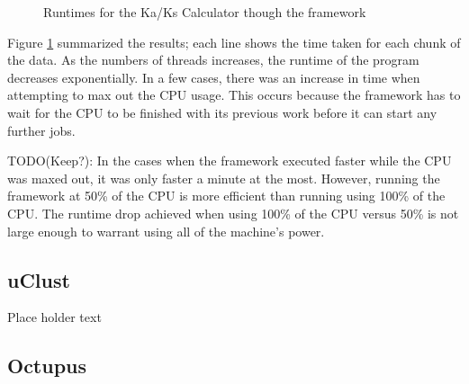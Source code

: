 \documentclass[12pt]{article}
\begin{document}
\begin{figure}
{}
\caption{Runtimes for the Ka/Ks Calculator though the framework}
\label{fig:kaksgraph}
\end{figure}

Figure \ref{fig:kaksgraph} summarized the results; each line shows the time taken for each chunk
of the data. As the numbers of threads increases, the runtime of the program
decreases exponentially. In a few cases, there was an increase in time when
attempting to max out the CPU usage. This occurs because the framework has to
wait for the CPU to be finished with its previous work before it can start any
further jobs. 

TODO(Keep?): In the cases when the framework executed faster while the CPU was 
maxed out, it was only faster a minute at the most. However, running the 
framework at 50\% of the CPU is more efficient than running using 100\% of the 
CPU. The runtime drop achieved when using 100\% of the CPU versus 50\% is not 
large enough to warrant using all of the machine's power.

\subsection{uClust}

Place holder text

\subsection{Octupus}
\end{document}
